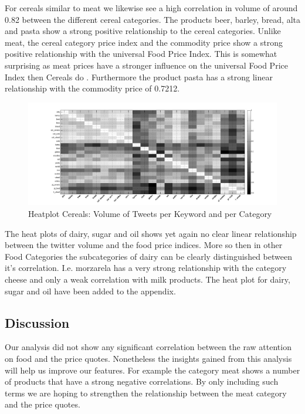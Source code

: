 For cereals similar to meat we likewise see a high correlation in volume of around 0.82 between the different cereal categories. The products beer, barley, bread, alta and pasta show a strong positive relationship to the cereal categories.   Unlike meat,  the cereal category price index and the commodity price show a strong positive relationship with the universal Food Price Index. This is somewhat surprising as meat prices have a stronger influence on the universal Food Price Index then Cereals do \cite{fao2008}. Furthermore the  product pasta has a strong linear relationship with the commodity price of 0.7212.
\begin{figure}[H]
        \centering
         \includegraphics[width=1\textwidth ]{img/anal/black_cereals}
              
        \caption{Heatplot Cereals: Volume of Tweets per Keyword and per Category}
        \label{fig:distribution}
\end{figure}
 

The heat plots of dairy, sugar and oil shows yet again no clear linear relationship between the twitter volume and the food price indices. More so then in other Food Categories the subcategories of dairy can be clearly distinguished between it's correlation. I.e. morzarela has a very strong relationship with the category cheese and only a weak correlation with milk products. The heat plot for dairy, sugar and oil have been added to the appendix.



\subsection{Discussion} 



Our analysis did not show any significant correlation between the raw attention on food and the price quotes.
Nonetheless the insights gained from this analysis will help us improve our features. For example the category meat shows a number of products that have a strong negative correlations. By only including such terms we are hoping to strengthen the relationship between the meat category and the price quotes.

